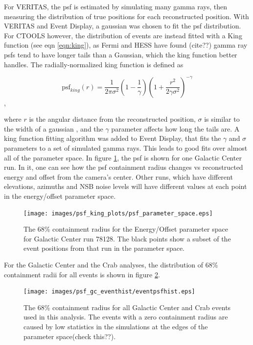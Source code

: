     For VERITAS, the psf is estimated by simulating many gamma rays, then measuring the distribution of true positions for each reconstructed position.
    With VERITAS and Event Display, a gaussian was chosen to fit the psf distribution.
    For CTOOLS however, the distribution of events are instead fitted with a King function (see eqn \ref{eqn:king}), as Fermi and HESS have found (cite??) gamma ray psfs tend to have longer tails than a Gaussian, which the king function better handles.
    The radially-normalized king function is defined as

    \begin{equation} \label{eqn:king}
    \text{psf}_{king}(r) = \frac{1}{2 \pi \sigma^{2} } \left( 1 - \frac{1}{\gamma} \right) \left( 1 + \frac{ r^{2} }{ 2 \gamma \sigma^{2} } \right)^{-\gamma}
    \end{equation},

    where $r$ is the angular distance from the reconstructed position, $\sigma$ is similar to the width of a gaussian , and the $\gamma$ parameter affects how long the tails are.
    A king function fitting algorithm was added to Event Display, that fits the $\gamma$ and $\sigma$ parameters to a set of simulated gamma rays.
    This leads to good fits over almost all of the parameter space.
    In figure \ref{fig:psf_paramspace}, the psf is shown for one Galactic Center run.
    In it, one can see how the psf containment radius changes vs reconstructed energy and offset from the camera's center.
    Other runs, which have different elevations, azimuths and NSB noise levels will have different values at each point in the energy/offset parameter space.

    \begin{figure}[ht]
      \centering
      \texttt{[image: images/psf\_king\_plots/psf\_parameter\_space.eps]}
      \caption[PSF Parameter Space]{
        The 68\% containment radius for the Energy/Offset parameter space for Galactic Center run 78128. 
        The black points show a subset of the event positions from that run in the parameter space.
      }
      \label{fig:psf_paramspace}
    \end{figure}

    For the Galactic Center and the Crab analyses, the distribution of 68\% containment radii for all events is shown in figure \ref{fig:gc_psf_hist}.

    \begin{figure}[ht]
      \centering
      \texttt{[image: images/psf\_gc\_eventhist/eventpsfhist.eps]}
      \caption[Crab and Galactic Center Event PSFs]{
        The 68\% containment radius for all Galactic Center and Crab events used in this analysis.
        The events with a zero containment radius are caused by low statistics in the simulations at the edges of the parameter space(check this??).
      }
      \label{fig:gc_psf_hist}
    \end{figure}

